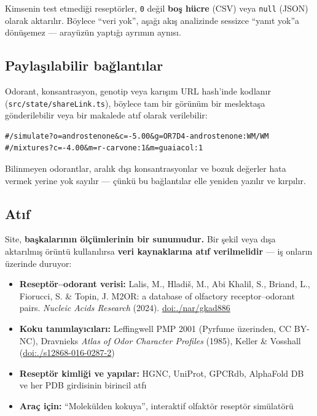 \documentclass[11pt,a4paper]{article}
\begin{document}
Kimsenin test etmediği reseptörler, \texttt{\small 0} değil \textbf{boş hücre} (CSV) veya \texttt{\small null} (JSON) olarak aktarılır. Böylece ``veri yok'', aşağı akış analizinde sessizce ``yanıt yok''a dönüşemez — arayüzün yaptığı ayrımın aynısı.


\subsection{Paylaşılabilir bağlantılar}

Odorant, konsantrasyon, genotip veya karışım URL hash'inde kodlanır (\texttt{\small src/state/shareLink.ts}), böylece tam bir görünüm bir meslektaşa gönderilebilir veya bir makalede atıf olarak verilebilir:


\begin{Verbatim}[fontsize=\small, xleftmargin=1em]
#/simulate?o=androstenone&c=-5.00&g=OR7D4-androstenone:WM/WM
#/mixtures?c=-4.00&m=r-carvone:1&m=guaiacol:1
\end{Verbatim}

Bilinmeyen odorantlar, aralık dışı konsantrasyonlar ve bozuk değerler hata vermek yerine yok sayılır — çünkü bu bağlantılar elle yeniden yazılır ve kırpılır.


\subsection{Atıf}

Site, \textbf{başkalarının ölçümlerinin bir sunumudur.} Bir şekil veya dışa aktarılmış örüntü kullanılırsa \textbf{veri kaynaklarına atıf verilmelidir} — iş onların üzerinde duruyor:

\begin{itemize}
\item \textbf{Reseptör–odorant verisi:} Lalis, M., Hladiš, M., Abi Khalil, S., Briand, L., Fiorucci, S. \& Topin, J. M2OR: a database of olfactory receptor–odorant pairs. \emph{Nucleic Acids Research} (2024). \href{https://doi.org/10.1093/nar/gkad886}{doi:./\allowbreak nar/\allowbreak gkad886}
\item \textbf{Koku tanımlayıcıları:} Leffingwell PMP 2001 (Pyrfume üzerinden, CC BY-NC), Dravnieks \emph{Atlas of Odor Character Profiles} (1985), Keller \& Vosshall (\href{https://doi.org/10.1186/s12868-016-0287-2}{doi:./\allowbreak s12868-016-0287-2})
\item \textbf{Reseptör kimliği ve yapılar:} HGNC, UniProt, GPCRdb, AlphaFold DB ve her PDB girdisinin birincil atfı
\item \textbf{Araç için:} ``Molekülden kokuya'', interaktif olfaktör reseptör simülatörü
\end{itemize}
\end{document}
